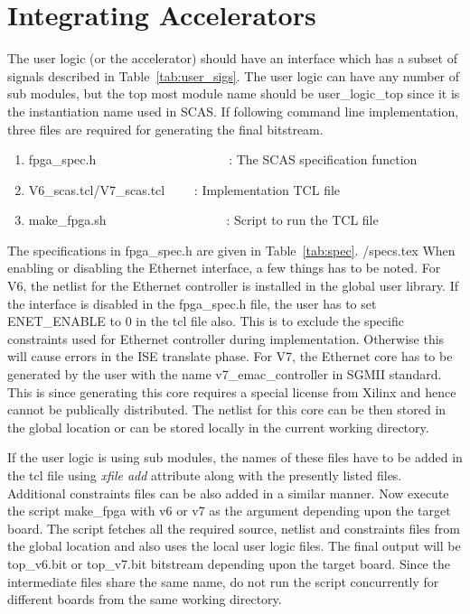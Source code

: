 \chapter{Integrating Accelerators}
\label{chap_integration}

The user logic (or the accelerator) should have an interface which has a subset of signals described in Table~\ref{tab:user_sigs}.
The user logic can have any number of sub modules, but the top most module name should be user\_logic\_top since it is the instantiation name used in SCAS.
If following command line implementation, three files are required for generating the final bitstream.\\
\begin{enumerate}
\item fpga\_spec.h~~~~~~~~~~~~~~~~~~~~~: The SCAS specification function
\item V6\_scas.tcl/V7\_scas.tcl ~~~~: Implementation TCL file
\item make\_fpga.sh~~~~~~~~~~~~~~~~~~~: Script to run the TCL file
\end{enumerate}
The specifications in fpga\_spec.h are given in Table~\ref{tab:spec}.
 \TBLDIR/specs.tex
When enabling or disabling the Ethernet interface, a few things has to be noted.
For V6, the netlist for the Ethernet controller is installed in the global user library.
If the interface is disabled in the fpga\_spec.h file, the user has to set ENET\_ENABLE to 0 in the tcl file also.
This is to exclude the specific constraints used for Ethernet controller during implementation.
Otherwise this will cause errors in the ISE translate phase.
For V7, the Ethernet core has to be generated by the user with the name v7\_emac\_controller in SGMII standard.
This is since generating this core requires a special license from Xilinx and hence cannot be publically distributed.
The netlist for this core can be then stored in the global location or can be stored locally in the current working directory.

If the user logic is using sub modules, the names of these files have to be added in the tcl file using \emph{xfile add} attribute along with the presently listed files.
Additional constraints files can be also added in a similar manner.
Now execute the script make\_fpga with v6 or v7 as the argument depending upon the target board.
The script fetches all the required source, netlist and constraints files from the global location and also uses the local user logic files.
The final output will be top\_v6.bit or top\_v7.bit bitstream depending upon the target board.
Since the intermediate files share the same name, do not run the script concurrently for different boards from the same working directory.